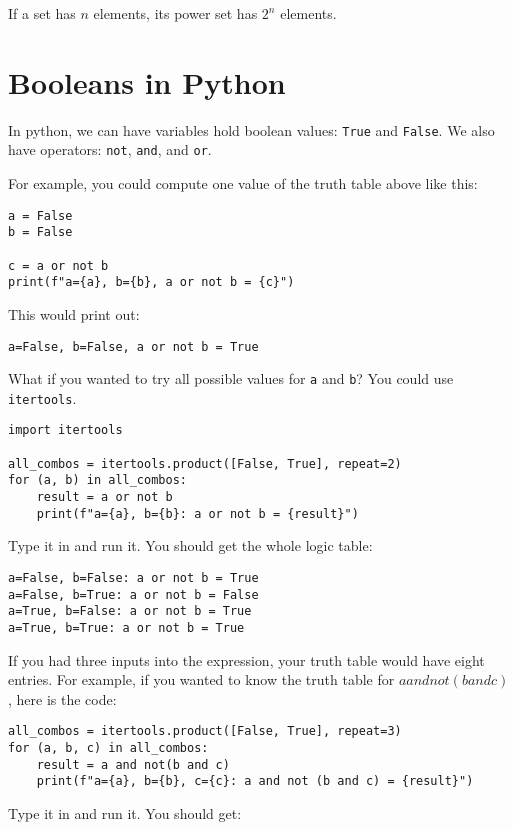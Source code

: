 If a set has $n$ elements, its power set has $2^n$ elements.

\section{Booleans in Python}

In python, we can have variables hold boolean values: \texttt{True}
and \texttt{False}.  We also have operators: \texttt{not},
\texttt{and}, and \texttt{or}.

For example, you could compute one value of the truth table above  like this:
\begin{verbatim}
a = False
b = False

c = a or not b
print(f"a={a}, b={b}, a or not b = {c}")
\end{verbatim}

This would print out:
\begin{verbatim}
a=False, b=False, a or not b = True
\end{verbatim}

What if you wanted to try all possible values for \texttt{a} and
\texttt{b}? You could use \texttt{itertools}.

\begin{verbatim}
import itertools

all_combos = itertools.product([False, True], repeat=2)
for (a, b) in all_combos:
    result = a or not b
    print(f"a={a}, b={b}: a or not b = {result}")       
\end{verbatim}

Type it in and run it. You should get the whole logic table:

\begin{verbatim}
a=False, b=False: a or not b = True
a=False, b=True: a or not b = False
a=True, b=False: a or not b = True
a=True, b=True: a or not b = True
\end{verbatim}

If you had three inputs into the expression, your truth table would
have eight entries.  For example, if you wanted to know the truth
table for $a and not(b and c)$, here is the code:

\begin{verbatim}
all_combos = itertools.product([False, True], repeat=3)
for (a, b, c) in all_combos:
    result = a and not(b and c)
    print(f"a={a}, b={b}, c={c}: a and not (b and c) = {result}")
\end{verbatim}

Type it in and run it. You should get:

